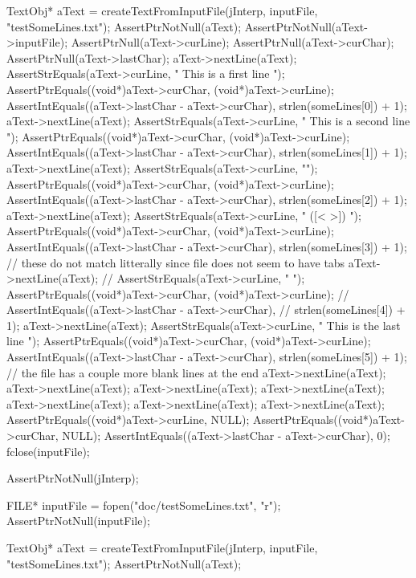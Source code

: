   TextObj* aText = createTextFromInputFile(jInterp, inputFile, "testSomeLines.txt");
  AssertPtrNotNull(aText);
  AssertPtrNotNull(aText->inputFile);
  AssertPtrNull(aText->curLine);
  AssertPtrNull(aText->curChar);
  AssertPtrNull(aText->lastChar);
  aText->nextLine(aText);
  AssertStrEquals(aText->curLine, "  This is a first line  \n");
  AssertPtrEquals((void*)aText->curChar, (void*)aText->curLine);
  AssertIntEquals((aText->lastChar - aText->curChar),
                        strlen(someLines[0]) + 1);
  aText->nextLine(aText);
  AssertStrEquals(aText->curLine, "  This is a second line   \n");
  AssertPtrEquals((void*)aText->curChar, (void*)aText->curLine);
  AssertIntEquals((aText->lastChar - aText->curChar),
                        strlen(someLines[1]) + 1);
  aText->nextLine(aText);
  AssertStrEquals(aText->curLine, "\n");
  AssertPtrEquals((void*)aText->curChar, (void*)aText->curLine);
  AssertIntEquals((aText->lastChar - aText->curChar),
                        strlen(someLines[2]) + 1);
  aText->nextLine(aText);
  AssertStrEquals(aText->curLine, " ([<{ }>]) \n");
  AssertPtrEquals((void*)aText->curChar, (void*)aText->curLine);
  AssertIntEquals((aText->lastChar - aText->curChar),
                        strlen(someLines[3]) + 1);
  // these do not match litterally since file does not seem to have tabs
  aText->nextLine(aText);
//  AssertStrEquals(aText->curLine, "     	\n");
  AssertPtrEquals((void*)aText->curChar, (void*)aText->curLine);
//  AssertIntEquals((aText->lastChar - aText->curChar),
//                        strlen(someLines[4]) + 1);
  aText->nextLine(aText);
  AssertStrEquals(aText->curLine, "  This is the last line  \n");
  AssertPtrEquals((void*)aText->curChar, (void*)aText->curLine);
  AssertIntEquals((aText->lastChar - aText->curChar),
                        strlen(someLines[5]) + 1);
  // the file has a couple more blank lines at the end
  aText->nextLine(aText);
  aText->nextLine(aText);
  aText->nextLine(aText);
  aText->nextLine(aText);
  aText->nextLine(aText);
  aText->nextLine(aText);
  aText->nextLine(aText);
  AssertPtrEquals((void*)aText->curLine, NULL);
  AssertPtrEquals((void*)aText->curChar, NULL);
  AssertIntEquals((aText->lastChar - aText->curChar), 0);
  fclose(inputFile);
\stopCTest
\stopTestCase

\startCTest
  AssertPtrNotNull(jInterp);

  FILE* inputFile = fopen("doc/testSomeLines.txt", "r");
  AssertPtrNotNull(inputFile);
  
  TextObj* aText = createTextFromInputFile(jInterp, inputFile, "testSomeLines.txt");
  AssertPtrNotNull(aText);

